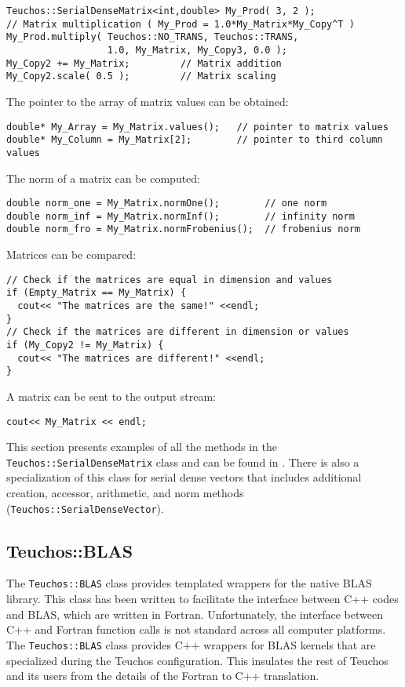 {\small
\begin{verbatim}
Teuchos::SerialDenseMatrix<int,double> My_Prod( 3, 2 );
// Matrix multiplication ( My_Prod = 1.0*My_Matrix*My_Copy^T )
My_Prod.multiply( Teuchos::NO_TRANS, Teuchos::TRANS, 
                  1.0, My_Matrix, My_Copy3, 0.0 );
My_Copy2 += My_Matrix;         // Matrix addition
My_Copy2.scale( 0.5 );         // Matrix scaling
\end{verbatim}}
The pointer to the array of matrix values can be obtained:
{\small
\begin{verbatim}
double* My_Array = My_Matrix.values();   // pointer to matrix values
double* My_Column = My_Matrix[2];        // pointer to third column values
\end{verbatim}}
The norm of a matrix can be computed:
{\small
\begin{verbatim}
double norm_one = My_Matrix.normOne();        // one norm
double norm_inf = My_Matrix.normInf();        // infinity norm
double norm_fro = My_Matrix.normFrobenius();  // frobenius norm
\end{verbatim}}
Matrices can be compared:
{\small
\begin{verbatim}
// Check if the matrices are equal in dimension and values
if (Empty_Matrix == My_Matrix) {
  cout<< "The matrices are the same!" <<endl;
}
// Check if the matrices are different in dimension or values
if (My_Copy2 != My_Matrix) {
  cout<< "The matrices are different!" <<endl;
}
\end{verbatim}}
A matrix can be sent to the output stream:
{\small
\begin{verbatim}
cout<< My_Matrix << endl;
\end{verbatim}}
This section presents examples of all the methods in the 
{\tt Teuchos::SerialDenseMatrix} class and can be found in
.  There is also a specialization of
this class for serial dense vectors that includes additional creation, accessor, 
arithmetic, and norm methods ({\tt Teuchos::SerialDenseVector}).


\subsection{Teuchos::BLAS}
\label{sec:teuchos:BLAS}

The \verb!Teuchos::BLAS! class provides templated wrappers for the native BLAS library.
This class has been written to facilitate the interface between C++ codes and BLAS,
which are written in Fortran.  Unfortunately, the interface between C++ and Fortran
function calls is not standard across all computer platforms.  The \verb!Teuchos::BLAS!
class provides C++ wrappers for BLAS kernels that are specialized during the Teuchos
configuration.  This insulates the rest of Teuchos and its users from the details of
the Fortran to C++ translation.

